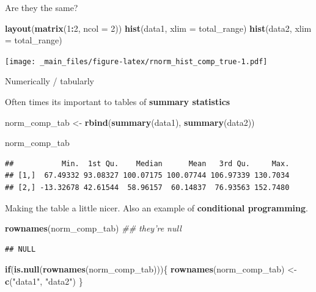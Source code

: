 \documentclass[
]{book}
\newenvironment{Shaded}{\begin{snugshade}}{\end{snugshade}}
\newcommand{\CommentTok}[1]{\textcolor[rgb]{0.56,0.35,0.01}{\textit{#1}}}
\newcommand{\ControlFlowTok}[1]{\textcolor[rgb]{0.13,0.29,0.53}{\textbf{#1}}}
\newcommand{\DataTypeTok}[1]{\textcolor[rgb]{0.13,0.29,0.53}{#1}}
\newcommand{\DecValTok}[1]{\textcolor[rgb]{0.00,0.00,0.81}{#1}}
\newcommand{\KeywordTok}[1]{\textcolor[rgb]{0.13,0.29,0.53}{\textbf{#1}}}
\newcommand{\NormalTok}[1]{#1}
\newcommand{\OperatorTok}[1]{\textcolor[rgb]{0.81,0.36,0.00}{\textbf{#1}}}
\newcommand{\StringTok}[1]{\textcolor[rgb]{0.31,0.60,0.02}{#1}}
\begin{document}
Are they the same?

\begin{Shaded}
\begin{Highlighting}[]
\KeywordTok{layout}\NormalTok{(}\KeywordTok{matrix}\NormalTok{(}\DecValTok{1}\OperatorTok{:}\DecValTok{2}\NormalTok{, }\DataTypeTok{ncol =} \DecValTok{2}\NormalTok{))}
\KeywordTok{hist}\NormalTok{(data1, }\DataTypeTok{xlim =}\NormalTok{ total_range)}
\KeywordTok{hist}\NormalTok{(data2, }\DataTypeTok{xlim =}\NormalTok{ total_range)}
\end{Highlighting}
\end{Shaded}

\texttt{[image: \_main\_files/figure-latex/rnorm\_hist\_comp\_true-1.pdf]}

Numerically / tabularly

Often times its important to tables of \textbf{summary statistics}

\begin{Shaded}
\begin{Highlighting}[]
\NormalTok{norm_comp_tab <-}\StringTok{ }\KeywordTok{rbind}\NormalTok{(}\KeywordTok{summary}\NormalTok{(data1),}
                       \KeywordTok{summary}\NormalTok{(data2))}

\NormalTok{norm_comp_tab}
\end{Highlighting}
\end{Shaded}

\begin{verbatim}
##           Min.  1st Qu.    Median      Mean   3rd Qu.     Max.
## [1,]  67.49332 93.08327 100.07175 100.07744 106.97339 130.7034
## [2,] -13.32678 42.61544  58.96157  60.14837  76.93563 152.7480
\end{verbatim}

Making the table a little nicer. Also an example of \textbf{conditional programming}.

\begin{Shaded}
\begin{Highlighting}[]
\KeywordTok{rownames}\NormalTok{(norm_comp_tab) }\CommentTok{## they're null}
\end{Highlighting}
\end{Shaded}

\begin{verbatim}
## NULL
\end{verbatim}

\begin{Shaded}
\begin{Highlighting}[]
\ControlFlowTok{if}\NormalTok{(}\KeywordTok{is.null}\NormalTok{(}\KeywordTok{rownames}\NormalTok{(norm_comp_tab)))\{}
  \KeywordTok{rownames}\NormalTok{(norm_comp_tab) <-}\StringTok{ }\KeywordTok{c}\NormalTok{(}\StringTok{"data1"}\NormalTok{, }\StringTok{"data2"}\NormalTok{)}
\NormalTok{\}}
\end{Highlighting}
\end{Shaded}
\end{document}

